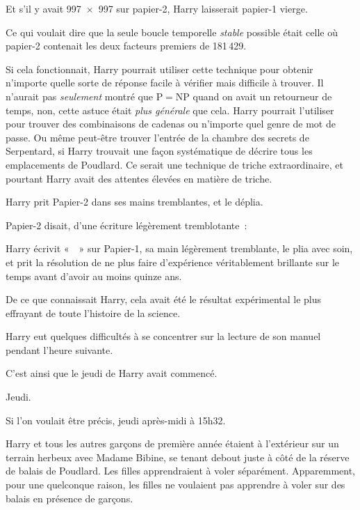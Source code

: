 Et s'il y avait 997~$\times$~997 sur papier-2, Harry laisserait papier-1 vierge.

Ce qui voulait dire que la seule boucle temporelle \emph{stable} possible était celle où papier-2 contenait les deux facteurs premiers de 181\,429.

Si cela fonctionnait, Harry pourrait utiliser cette technique pour obtenir n'importe quelle sorte de réponse facile à vérifier mais difficile à trouver.
Il n'aurait pas \emph{seulement} montré que P$=$NP quand on avait un retourneur de temps, non, cette astuce était \emph{plus générale} que cela.
Harry pourrait l'utiliser pour trouver des combinaisons de cadenas ou n'importe quel genre de mot de passe.
Ou même peut-être trouver l'entrée de la chambre des secrets de Serpentard, si Harry trouvait une façon systématique de décrire tous les emplacements de Poudlard.
Ce serait une technique de triche extraordinaire, et pourtant Harry avait des attentes élevées en matière de triche.

Harry prit Papier-2 dans ses mains tremblantes, et le déplia.

Papier-2 disait, d'une écriture légèrement tremblotante~:

\quad

\centerline{
}
\quad

Harry écrivit «~~» sur Papier-1, sa main légèrement tremblante, le plia avec soin, et prit la résolution de ne plus faire d'expérience véritablement brillante sur le temps avant d'avoir au moins quinze ans.

De ce que connaissait Harry, cela avait été le résultat expérimental le plus effrayant de toute l'histoire de la science.

Harry eut quelques difficultés à se concentrer sur la lecture de son manuel pendant l'heure suivante.

C'est ainsi que le jeudi de Harry avait commencé.

\later

Jeudi.

Si l'on voulait être précis, jeudi après-midi à 15h32.

Harry et tous les autres garçons de première année étaient à l'extérieur sur un terrain herbeux avec Madame Bibine, se tenant debout juste à côté de la réserve de balais de Poudlard.
Les filles apprendraient à voler séparément.
Apparemment, pour une quelconque raison, les filles ne voulaient pas apprendre à voler sur des balais en présence de garçons.

